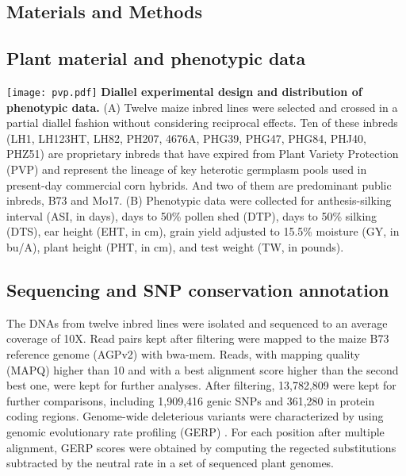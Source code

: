 \documentclass[a0,portrait]{a0poster}
\begin{document}
\begin{multicols}{2}

\section*{Materials and Methods}

\subsection*{Plant material and phenotypic data}
\begin{center}\vspace{1cm}
\texttt{[image: pvp.pdf]}
{\color{black} \textbf{Diallel experimental design and distribution of phenotypic data.}
(A) Twelve maize inbred lines were selected and crossed in a partial diallel fashion without considering reciprocal effects. Ten of these inbreds (LH1, LH123HT, LH82, PH207, 4676A, PHG39, PHG47, PHG84, PHJ40, PHZ51) are proprietary inbreds that have expired from Plant Variety Protection (PVP) and represent the lineage of key heterotic germplasm pools used in present-day commercial corn hybrids. And two of them are predominant public inbreds, B73 and Mo17. (B) Phenotypic data were collected for anthesis-silking interval (ASI, in days), days to 50\% pollen shed (DTP), days to 50\% silking (DTS), ear height (EHT, in cm), grain yield adjusted to 15.5\% moisture (GY, in bu/A), plant height (PHT, in cm), and test weight (TW, in pounds).
}
\end{center}\vspace{1cm}

\subsection*{Sequencing and SNP conservation annotation}
The DNAs from twelve inbred lines were isolated and sequenced to an average coverage of 10X. Read pairs kept after filtering were mapped to the maize B73 reference genome (AGPv2) with bwa-mem. Reads, with mapping quality (MAPQ) higher than 10 and with a best alignment score higher than the second best one, were kept for further analyses. After filtering, 13,782,809 were kept for further comparisons, including 1,909,416 genic SNPs and 361,280 in protein coding regions. Genome-wide deleterious variants were characterized by using genomic evolutionary rate profiling (GERP) \citep{Davydov2010}. For each position after multiple alignment, GERP scores were obtained by computing the regected substitutions subtracted by the neutral rate in a set of sequenced plant genomes. 


\end{multicols}
\end{document}
